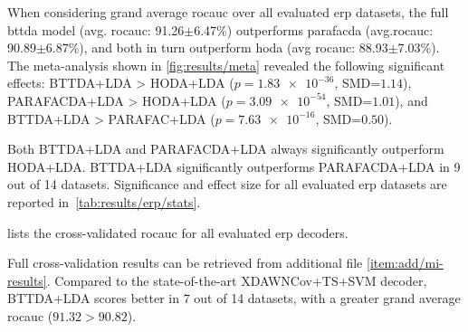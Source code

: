 \documentclass[twocolumn]{article}
\begin{document}
When considering grand average \ac{rocauc} over all evaluated \ac{erp} datasets,
the full \ac{bttda} model (avg. \ac{rocauc}: 91.26$\pm$6.47\%) outperforms \ac{parafacda}
(avg.\ac{rocauc}: 90.89$\pm$6.87\%),
and both in turn outperform \ac{hoda} (avg \ac{rocauc}: 88.93$\pm$7.03\%).
The meta-analysis shown in \cref{fig:results/meta} revealed the following
significant effects:
BTTDA+LDA > HODA+LDA ($p=\num{1.83e-36}$, SMD=$1.14$),
PARAFACDA+LDA > HODA+LDA ($p=\num{3.09e-54}$, SMD=$1.01$), and
BTTDA+LDA > PARAFAC+LDA ($p=\num{7.63e-16}$, SMD=$0.50$).
Both BTTDA+LDA and PARAFACDA+LDA always significantly outperform HODA+LDA.
BTTDA+LDA significantly outperforms PARAFACDA+LDA in 9 out of 14 datasets.
Significance and effect size for all evaluated \ac{erp} datasets are reported in~\cref{tab:results/erp/stats}.

 lists the cross-validated \ac{rocauc} for all evaluated
\ac{erp} decoders.
\begin{sidewaystable*}
	\footnotesize
	
	\caption{Area under the receiver operating characteristic curve for
		cross-validated within-session evaluation of HODA+LDA and our proposed decoders
		PARAFACDA+DLA and BTTDA+LDA evaluated on \ac{erp} datasets.
		Scores for other decoders were taken from \textcite{Chevallier2024}.
		BTTDA+LDA always outperforms HODA+LDA and PARAFACDA+LDA, except for datasets,
		and consistently is nearly on par with or outperforms
		the state-of-the-art XDAwnCov+TS+SVM decoder.
	}
	\label{tab:results/erp/score}
\end{sidewaystable*}
Full cross-validation results can be retrieved from additional file \cref{item:add/mi-results}.
Compared to the state-of-the-art XDAWNCov+TS+SVM decoder, BTTDA+LDA scores
better in 7 out of 14 datasets, with a greater grand average \ac{rocauc}
($91.32 > 90.82$).
\end{document}
